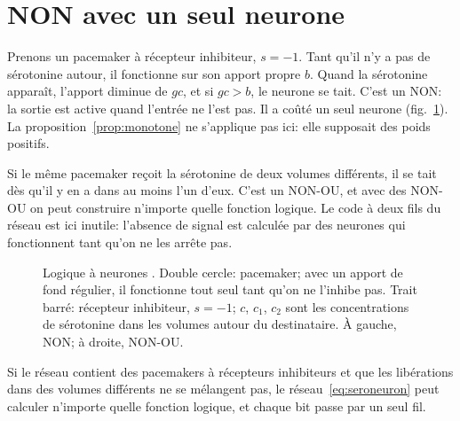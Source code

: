 \section{NON avec un seul neurone}

Prenons un pacemaker à récepteur inhibiteur, $s=-1$. Tant qu'il n'y a pas de sérotonine autour, il fonctionne sur son apport propre $b$. Quand la sérotonine apparaît, l'apport diminue de $gc$, et si $gc>b$, le neurone se tait. C'est un NON: la sortie est active quand l'entrée ne l'est pas. Il a coûté un seul neurone (fig.~\ref{fig:serogates}). La proposition~\ref{prop:monotone} ne s'applique pas ici: elle supposait des poids positifs.

Si le même pacemaker reçoit la sérotonine de deux volumes différents, il se tait dès qu'il y en a dans au moins l'un d'eux. C'est un NON-OU, et avec des NON-OU on peut construire n'importe quelle fonction logique. Le code à deux fils du réseau  est ici inutile: l'absence de signal est calculée par des neurones qui fonctionnent tant qu'on ne les arrête pas.

\begin{figure}[t]
\centering
{}
\caption{Logique à neurones . Double cercle: pacemaker; avec un apport de fond régulier, il fonctionne tout seul tant qu'on ne l'inhibe pas. Trait barré: récepteur inhibiteur, $s=-1$; $c$, $c_1$, $c_2$ sont les concentrations de sérotonine dans les volumes autour du destinataire. À gauche, NON; à droite, NON-OU.}
\label{fig:serogates}
\end{figure}

\begin{keyblock}
\begin{proposition}
\label{prop:serocomplete}
Si le réseau contient des pacemakers à récepteurs inhibiteurs et que les libérations dans des volumes différents ne se mélangent pas, le réseau~\eqref{eq:seroneuron} peut calculer n'importe quelle fonction logique, et chaque bit passe par un seul fil.
\end{proposition}
\end{keyblock}

